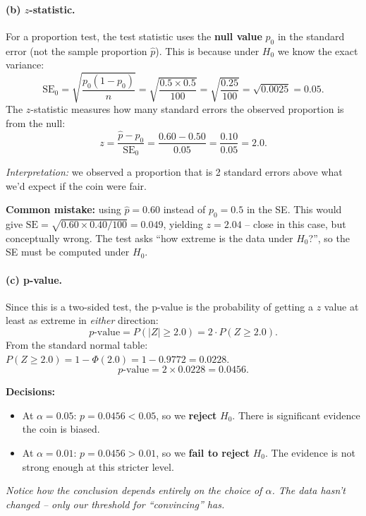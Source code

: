 \documentclass[11pt]{article}
\newcommand{\phat}{\hat{p}}
\begin{document}
\paragraph{(b) $z$-statistic.}

For a proportion test, the test statistic uses the \textbf{null value} $p_0$ in the standard error (not the sample proportion $\phat$). This is because under $H_0$ we know the exact variance:
\[
  \text{SE}_0 = \sqrt{\frac{p_0(1-p_0)}{n}} = \sqrt{\frac{0.5 \times 0.5}{100}} = \sqrt{\frac{0.25}{100}} = \sqrt{0.0025} = 0.05.
\]
The $z$-statistic measures how many standard errors the observed proportion is from the null:
\[
  z = \frac{\phat - p_0}{\text{SE}_0} = \frac{0.60 - 0.50}{0.05} = \frac{0.10}{0.05} = \boxed{2.0}.
\]

\textit{Interpretation:} we observed a proportion that is 2 standard errors above what we'd expect if the coin were fair.

\textbf{Common mistake:} using $\phat = 0.60$ instead of $p_0 = 0.5$ in the SE. This would give $\text{SE} = \sqrt{0.60 \times 0.40 / 100} = 0.049$, yielding $z = 2.04$ -- close in this case, but conceptually wrong. The test asks ``how extreme is the data under $H_0$?'', so the SE must be computed under $H_0$.

\paragraph{(c) p-value.}

Since this is a two-sided test, the p-value is the probability of getting a $z$ value at least as extreme in \textit{either} direction:
\[
  p\text{-value} = P(|Z| \geq 2.0) = 2 \cdot P(Z \geq 2.0).
\]
From the standard normal table: $P(Z \geq 2.0) = 1 - \Phi(2.0) = 1 - 0.9772 = 0.0228$.
\[
  p\text{-value} = 2 \times 0.0228 = \boxed{0.0456}.
\]

\textbf{Decisions:}
\begin{itemize}
  \item At $\alpha = 0.05$: $p = 0.0456 < 0.05$, so we \textbf{reject} $H_0$. There is significant evidence the coin is biased.
  \item At $\alpha = 0.01$: $p = 0.0456 > 0.01$, so we \textbf{fail to reject} $H_0$. The evidence is not strong enough at this stricter level.
\end{itemize}

\textit{Notice how the conclusion depends entirely on the choice of $\alpha$. The data hasn't changed -- only our threshold for ``convincing'' has.}
\end{document}
